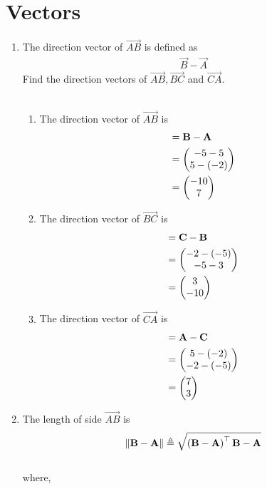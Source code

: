 \documentclass[10pt]{book}
\begin{document}
\section{Vectors}
\begin{enumerate}[label=\thesection.\arabic*.,ref=\thesection.\theenumi]
\item The direction vector of $\vec{AB}$ is defined as
\begin{align}
    \vec{B}-
    \vec{A}
\end{align} 
 Find the direction vectors of $\vec{AB}, \vec{BC}$ and $\vec{CA}$.\\
\solution\\
\begin{enumerate}
\item The direction vector of $\vec{AB}$ is
\begin{align}
    &= \vec{B}- \vec{A}\\ &= \myvec{ -5  - 5 \\  5  -(-2) }\\ &= \myvec{ -10 \\ 7}
    \label{eq:geo-dir-vec-ab}
\end{align}
\item The direction vector of $\vec{BC}$ is
\begin{align}
    &= \vec{C}- \vec{B}\\ &= \myvec{ -2 - (-5)\\ -5 - 3}\\ &=\myvec{ 3 \\ -10}
    \label{eq:geo-dir-vec-bc}
\end{align}
\item The direction vector of $\vec{CA}$ is
\begin{align}
    &= \vec{A}- \vec{C}\\ &= \myvec{ 5 - (-2)\\ -2 -(-5)}\\ &=\myvec{ 7 \\ 3}
    \label{eq:geo-dir-vec-ca}
\end{align}
\end{enumerate}
\item The length of side $\vec{AB}$ is
\begin{align}
\left\lVert\mathbf{B}-\mathbf{A}\right\rVert \triangleq \sqrt{\left(\mathbf{B}-\mathbf{A}\right)^{\top}{\mathbf{B}-\mathbf{A}}}
\end{align}\\
where,
\begin{align}
\begin{split}

\end{split}
\end{align}
\end{enumerate}
\end{document}
